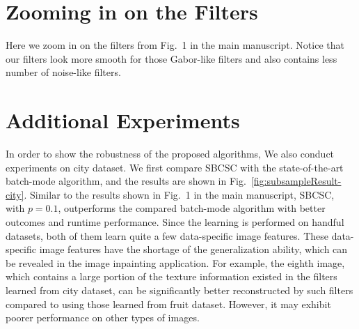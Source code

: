 \documentclass[10pt,twocolumn,letterpaper]{article}
\begin{document}
\section{Zooming in on the Filters}

Here we zoom in on the filters from Fig.~1 in the main manuscript. Notice that our filters look more smooth for those Gabor-like filters and also contains less number of noise-like filters.

\section{Additional Experiments}
In order to show the robustness of the proposed algorithms, We also conduct experiments on city dataset. We first compare SBCSC with the state-of-the-art batch-mode algorithm, and the results are shown in Fig.\ \ref{fig:subsampleResult-city}. Similar to the results shown in Fig.~1 in the main manuscript, SBCSC, with $p=0.1$, outperforms the compared batch-mode algorithm with better outcomes and runtime performance. Since the learning is performed on handful datasets, both of them learn quite a few data-specific image features. These data-specific image features have the shortage of the generalization ability, which can be revealed in the image inpainting application. For example, the eighth image, which contains a large portion of the texture information existed in the filters learned from city dataset, can be significantly better reconstructed by such filters compared to using those learned from fruit dataset. However, it may exhibit poorer performance on other types of images. 
\end{document}

